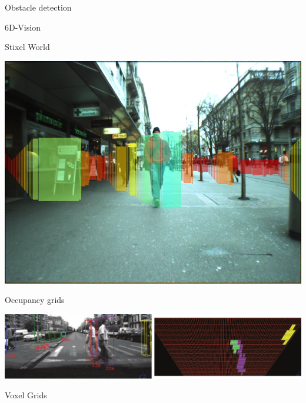 \begin{frame}[plain]{Obstacle detection}
\begin{overlayarea}{\textwidth}{\textheight}
{\begin{block}{6D-Vision}
\begin{center}
	  \end{center}
	\end{block}
      }
       {
	\vspace{-4.5cm}
	\begin{block}{Stixel World}
	  \begin{center}
	    \includegraphics[height=0.5\textheight]{stixels_over_original}
	  \end{center}
	\end{block}
      }
       {
	\vspace{-3cm}
	\begin{block}{Occupancy grids}
	  \begin{center}
	    \includegraphics[width=\textwidth]{danescuPF}
	  \end{center}
	\end{block}
      }
       {
	\vspace{-8.2cm}
	\begin{block}{Voxel Grids}
	  \begin{center}

\end{center}
\end{block}}
\end{overlayarea}
\end{frame}
